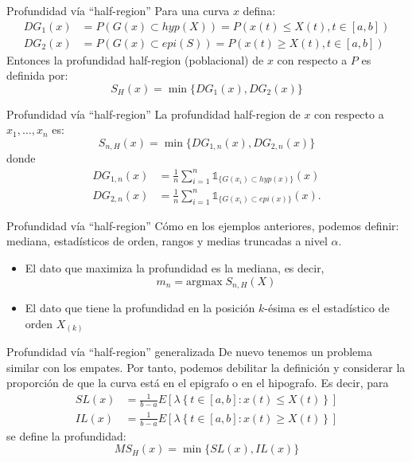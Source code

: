 \documentclass[10pt]{beamer}
\begin{document}
{{\begin{frame}{Profundidad vía ``half-region''}
    Para una curva $x$ defina:
    \begin{align*}
      DG_1(x)&=P(G(x)\subset hyp(X))=P(x(t)\leq X(t),t\in [a,b])\\[0.2 cm]
      DG_2(x)&=P(G(x)\subset epi(S))=P(x(t)\geq X(t),t\in [a,b])
    \end{align*}
    Entonces la profundidad half-region (poblacional) de $x$ con respecto a $P$ es definida por:
    $$S_H(x)=\min\{DG_1(x),DG_2(x)\}$$
\end{frame}

\begin{frame}{Profundidad vía ``half-region''}
    La profundidad half-region de $x$ con respecto a $x_1,\ldots, x_n$ es:
    $$S_{n,H}(x)=\min\{DG_{1,n}(x),DG_{2,n}(x)\}$$
    donde 
    \begin{align*}
        DG_{1,n}(x)&=\frac{1}{n}\sum_{i=1}^{n}\mathds{1}_{\{G(x_i)\subset hyp(x)\}}(x)\\[0.2cm]
        DG_{2,n}(x)&=\frac{1}{n}\sum_{i=1}^{n}\mathds{1}_{\{G(x_i)\subset epi(x)\}}(x).
    \end{align*}
\end{frame}

\begin{frame}{Profundidad vía ``half-region''}
    Cómo en los ejemplos anteriores, podemos definir: mediana, estadísticos de orden, rangos y medias truncadas a nivel $\alpha$. 
    \begin{itemize}
        \item El dato que maximiza la profundidad es la mediana, es decir, 
        $$m_n=\mathrm{argmax}\;S_{n,H}(X)$$
        \item El dato que tiene la profundidad en la posición $k$-ésima es el estadístico de orden $X_{(k)}$ 
    \end{itemize}
\end{frame}

\begin{frame}{Profundidad vía ``half-region'' generalizada}
    De nuevo tenemos un problema similar con los empates. Por tanto, podemos debilitar la definición y considerar la proporción de  que la curva está en el epigrafo o en el hipografo. Es decir, para  
    \begin{align*}
        SL(x)&=\frac{1}{b-a}E[\lambda\left\{t\in[a,b]:x(t)\leq X(t)\right\}]\\
        IL(x)&=\frac{1}{b-a}E[\lambda\left\{t\in[a,b]:x(t)\geq X(t)\right\}]
    \end{align*}
    se define la profundidad:
    \[MS_H(x)=\min\{SL(x),IL(x)\}\]
\end{frame}

}}
\end{document}
